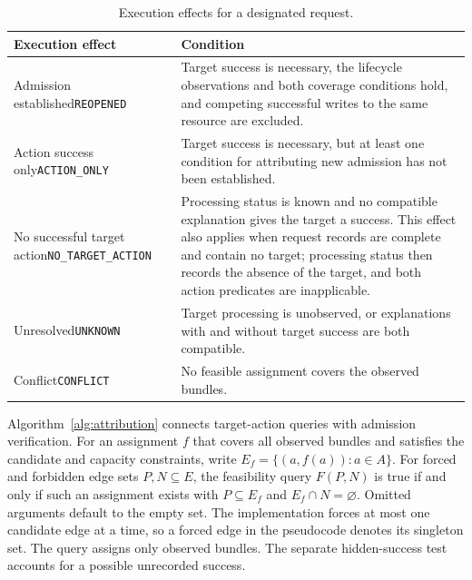 \begin{table}[t]
\centering
\caption{Execution effects for a designated request.}
\label{tab:2}
\begin{tabularx}{\textwidth}{@{}p{}X@{}}
\toprule
Execution effect & Condition \\
\midrule
Admission established\newline\texttt{REOPENED} &
Target success is necessary, the lifecycle observations and both coverage conditions hold, and competing successful writes to the same resource are excluded.\\
Action success only\newline\texttt{ACTION\_ONLY} &
Target success is necessary, but at least one condition for attributing new admission has not been established.\\
No successful target action\newline\texttt{NO\_TARGET\_ACTION} &
Processing status is known and no compatible explanation gives the target a success. This effect also applies when request records are complete and contain no target; processing status then records the absence of the target, and both action predicates are inapplicable.\\
Unresolved\newline\texttt{UNKNOWN} &
Target processing is unobserved, or explanations with and without target success are both compatible.\\
Conflict\newline\texttt{CONFLICT} &
No feasible assignment covers the observed bundles.\\
\bottomrule
\end{tabularx}
\end{table}

Algorithm~\ref{alg:attribution} connects target-action queries with admission verification. For an assignment $f$ that covers all observed bundles and satisfies the candidate and capacity constraints, write $E_f=\{(a,f(a)):a\in A\}$. For forced and forbidden edge sets $P,N\subseteq E$, the feasibility query $F(P,N)$ is true if and only if such an assignment exists with $P\subseteq E_f$ and $E_f\cap N=\varnothing$. Omitted arguments default to the empty set. The implementation forces at most one candidate edge at a time, so a forced edge in the pseudocode denotes its singleton set. The query assigns only observed bundles. The separate hidden-success test accounts for a possible unrecorded success.

